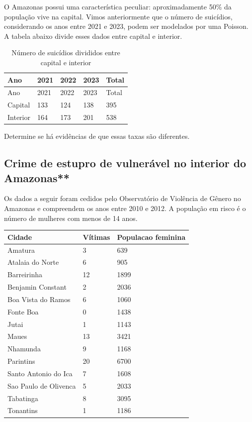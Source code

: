 \documentclass[
  letterpaper,
  DIV=11,
  numbers=noendperiod]{scrreprt}
\theoremstyle{definition}
\theoremstyle{plain}
\theoremstyle{definition}
\theoremstyle{remark}
\begin{document}
O Amazonas possui uma característica peculiar: aproximadamente 50\% da
população vive na capital. Vimos anteriormente que o número de
suicídios, considerando os anos entre 2021 e 2023, podem ser modelados
por uma Poisson. A tabela abaixo divide esses dados entre capital e
interior.

\begin{longtable}[]{@{}lllll@{}}
\caption{Número de suicídios divididos entre capital e
interior}\tabularnewline
\toprule\noalign{}
Ano & 2021 & 2022 & 2023 & Total \\
\midrule\noalign{}
\endfirsthead
\toprule\noalign{}
Ano & 2021 & 2022 & 2023 & Total \\
\midrule\noalign{}
\endhead
\bottomrule\noalign{}
\endlastfoot
Capital & 133 & 124 & 138 & 395 \\
Interior & 164 & 173 & 201 & 538 \\
\end{longtable}

Determine se há evidências de que essas taxas são diferentes.

\subsection{Crime de estupro de vulnerável no interior do
Amazonas**}\label{crime-de-estupro-de-vulneruxe1vel-no-interior-do-amazonas-1}

Os dados a seguir foram cedidos pelo Observatório de Violência de Gênero
no Amazonas e compreendem os anos entre 2010 e 2012. A população em
risco é o número de mulheres com menos de 14 anos.

\begin{longtable}[]{@{}lll@{}}
\toprule\noalign{}
Cidade & Vítimas & Populacao feminina \\
\midrule\noalign{}
\endhead
\bottomrule\noalign{}
\endlastfoot
Amatura & 3 & 639 \\
Atalaia do Norte & 6 & 905 \\
Barreirinha & 12 & 1899 \\
Benjamin Constant & 2 & 2036 \\
Boa Vista do Ramos & 6 & 1060 \\
Fonte Boa & 0 & 1438 \\
Jutai & 1 & 1143 \\
Maues & 13 & 3421 \\
Nhamunda & 9 & 1168 \\
Parintins & 20 & 6700 \\
Santo Antonio do Ica & 7 & 1608 \\
Sao Paulo de Olivenca & 5 & 2033 \\
Tabatinga & 8 & 3095 \\
Tonantins & 1 & 1186 \\
\end{longtable}
\end{document}
